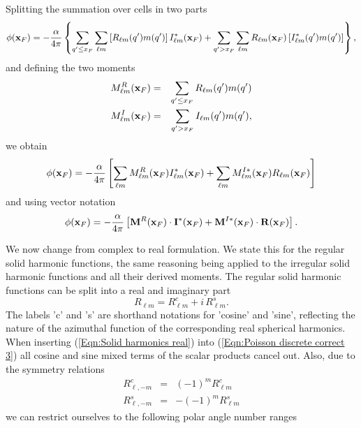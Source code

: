 Splitting the summation over cells in two parts
\begin{equation}
\label{Eqn:Poisson discrete correct 1}
\phi({\bf x}_F) = -{\alpha\over 4\pi}\left\{
\sum_{q'\leq x_F} \sum_{\ell m}\left[R_{\ell m}(q')m(q')\right]I_{\ell m}^*({\bf x}_F)
+ \sum_{q'>x_F} \sum_{\ell m}R_{\ell m}({\bf x}_F)\left[I_{\ell m}^*(q')m(q')\right]\right\},
\end{equation}
and defining the two moments
\begin{eqnarray}
M^R_{\ell m}({\bf x}_F) & = & \sum_{q'\leq x_F} R_{\ell m}(q')m(q') \label{Eqn:Moment definition 1} \\
M^I_{\ell m}({\bf x}_F) & = & \sum_{q'>x_F} I_{\ell m}(q')m(q'),\label{Eqn:Moment definition 2}
\end{eqnarray}
we obtain
\begin{equation}
\label{Eqn:Poisson discrete correct 2}
\phi({\bf x}_F) = -{\alpha\over 4\pi}\left[
\sum_{\ell m}M^R_{\ell m}({\bf x}_F)I_{\ell m}^*({\bf x}_F)
+ \sum_{\ell m}M^{I*}_{\ell m}({\bf x}_F)R_{\ell m}({\bf x}_F)\right]
\end{equation}
and using vector notation
\begin{equation}
\label{Eqn:Poisson discrete correct 3}
\phi({\bf x}_F) = -{\alpha\over 4\pi}\left[
{\bf M}^R({\bf x}_F)\cdot {\bf I}^*({\bf x}_F) + {\bf M}^{I*}({\bf x}_F)\cdot {\bf R}({\bf x}_F)
\right].
\end{equation}
\par
We now change from complex to real formulation. We state this for the regular
solid harmonic functions, the same reasoning being applied to the irregular
solid harmonic functions and all their derived moments. The regular solid
harmonic functions can be split into a real and imaginary part
\begin{equation}
\label{Eqn:Solid harmonics real}
R_{\ell m} = R_{\ell m}^c + i\,R_{\ell m}^s.
\end{equation} 
The labels 'c' and 's' are shorthand notations for 'cosine' and 'sine',
reflecting the nature of the azimuthal function of the corresponding real
spherical harmonics. When inserting (\ref{Eqn:Solid harmonics real}) into
(\ref{Eqn:Poisson discrete correct 3}) all cosine and sine mixed terms of the
scalar products cancel out. Also, due to the symmetry relations
\begin{eqnarray}
R_{\ell,-m}^c & = & (-1)^m R_{\ell m}^c \\
R_{\ell,-m}^s & = & -(-1)^m R_{\ell m}^s
\end{eqnarray} 
we can restrict ourselves to the following polar angle number ranges
